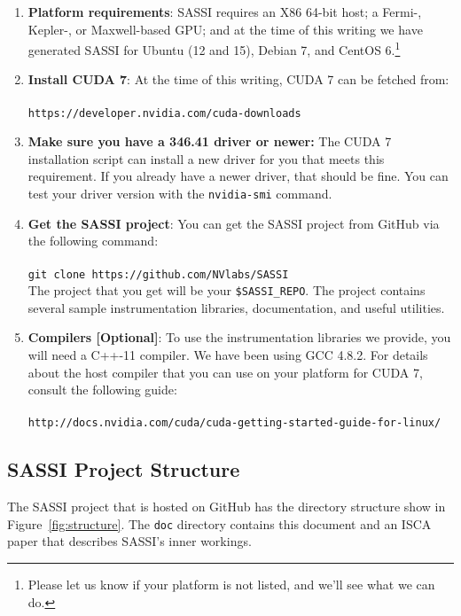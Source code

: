 \begin{enumerate}
\item {\bf Platform requirements}: SASSI requires an X86 64-bit host;
  a Fermi-, Kepler-, or Maxwell-based GPU; and at the time of this
  writing we have generated SASSI for Ubuntu (12 and 15), Debian
  7, and CentOS 6.\footnote{Please let us know if your platform
    is not listed, and we'll see what we can do.}
\item {\bf Install CUDA 7}: At the time of this writing, CUDA 7 can
  be fetched
  from:\\ \\  \texttt{https://developer.nvidia.com/cuda-downloads} \\
\item {\bf Make sure you have a 346.41 driver or newer:} The CUDA 7
  installation script can install a new driver for you that meets this
  requirement.  If you already have a newer driver, that should be
  fine.  You can test your driver version with the \texttt{nvidia-smi}
  command.
\item {\bf Get the SASSI project}: You can get the SASSI project from
  GitHub via the following command: \\ \\ \texttt{git clone
    https://github.com/NVlabs/SASSI} \\
  The project that you get will be your \texttt{\$SASSI\_REPO}.  The
  project contains several sample instrumentation libraries,
  documentation, and useful utilities.
\item {\bf Compilers [Optional]}: To use the instrumentation libraries
  we provide, you will need a C++-11 compiler.  We have been using GCC
  4.8.2.  For details about the host compiler that you can use on your
  platform for CUDA 7, consult the following
  guide:\\ \\ \texttt{http://docs.nvidia.com/cuda/cuda-getting-started-guide-for-linux/}
\end{enumerate}

\subsection{SASSI Project Structure}

The SASSI project that is hosted on GitHub has the directory structure
show in Figure~\ref{fig:structure}.  The \texttt{doc} directory
contains this document and an ISCA paper that describes SASSI's inner
workings.


